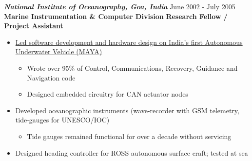 \vspace{8pt}
{\sl \href{http://nio.org}{\textbf{National Institute of Oceanography, Goa, India}}}       \hfill               June 2002 - July 2005 \\[2pt]
\textbf{Marine Instrumentation \& Computer Division} \hfill \textbf{Research Fellow / Project Assistant}
 \begin{itemize} \itemsep -2pt
 \item  \href{http://robotics.usc.edu/~ampereir/wordpress/?page_id=425}{Led software development and hardware design on India's first Autonomous Underwater Vehicle (MAYA)}
 \begin{itemize} 
 \item[$\checkmark$] Wrote over 95\% of Control, Communications, Recovery, Guidance and Navigation code
 \item[$\checkmark$] Designed embedded circuitry for CAN actuator nodes
 \end{itemize}
 \item  Developed oceanographic instruments (wave-recorder with GSM telemetry, tide-gauges for UNESCO/IOC)
 \begin{itemize}
 \item[$\checkmark$] Tide gauges remained functional for over a decade without servicing
 \end{itemize}
 \item  Designed heading controller for ROSS autonomous surface craft; tested at sea
 \end{itemize}

\vspace{0.2in}
